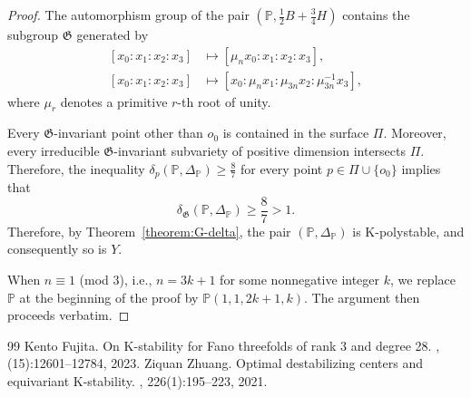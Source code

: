 \documentclass[10pt,a4paper]{amsart}
\begin{document}
\begin{proof}
The automorphism group of the pair $\left(\mathbb{P},\frac12B+\frac34H\right)$ contains the subgroup $\mathfrak{G}$ generated by
\[
\begin{aligned}
[x_0:x_1:x_2:x_3]
&\longmapsto
[\mu_nx_0:x_1:x_2:x_3],\\
[x_0:x_1:x_2:x_3]
&\longmapsto
[x_0:\mu_nx_1:\mu_{3n}x_2:\mu_{3n}^{-1}x_3],
\end{aligned}
\]
where $\mu_r$ denotes a primitive $r$-th root of unity.

Every $\mathfrak{G}$-invariant point other than $o_0$ is contained in the surface $\Pi$. Moreover, every irreducible $\mathfrak{G}$-invariant subvariety of positive dimension intersects $\Pi$. Therefore, the inequality
$
\delta_p\left(\mathbb{P},\Delta_\mathbb{P}\right)\geq\frac{8}{7}
$
for every point $p\in\Pi\cup\{o_0\}$ implies that \[
\delta_\mathfrak{G}\left(\mathbb{P},\Delta_\mathbb{P}\right)\geq\frac{8}{7}>1.
\]
Therefore, by Theorem~\ref{theorem:G-delta}, the pair $(\mathbb{P},\Delta_\mathbb{P})$ is K-polystable, and consequently so is $Y$.



When  $n\equiv 1$  (mod $3$), i.e., $n=3k+1$ for some nonnegative integer $k$, we replace $\mathbb{P}$ at the beginning of the proof by $\mathbb{P}(1,1,2k+1,k)$. The argument then proceeds verbatim.
\end{proof}

\begin{thebibliography}{99}
 Kento Fujita. \newblock On {K}-stability for {F}ano threefolds of rank 3 and degree 28. , (15):12601--12784, 2023.
 Ziquan Zhuang. \newblock Optimal destabilizing centers and equivariant {K}-stability. , 226(1):195--223, 2021.
\end{thebibliography}
\end{document}
